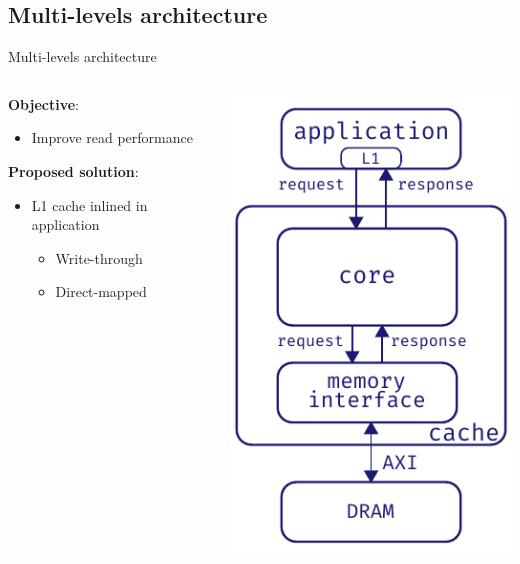 \documentclass[aspectratio=169]{beamer}
\begin{document}
\subsection{Multi-levels architecture}
\begin{frame}{Multi-levels architecture}
	\begin{columns}
		\begin{column}{.5\textwidth}
			\textbf{Objective}:
			\begin{itemize}
				\item Improve read performance
			\end{itemize}
			
			\bigskip
			\textbf{Proposed solution}:
			\begin{itemize}
				\item L1 cache inlined in application
					\begin{itemize}
						\item Write-through
						\item Direct-mapped
					\end{itemize}
			\end{itemize}
		\end{column}
		\begin{column}{.5\textwidth}
			\begin{center}
			\includegraphics[height=.7\textheight]{l1_arch}
			\end{center}
		\end{column}
	\end{columns}
\end{frame}
\end{document}
